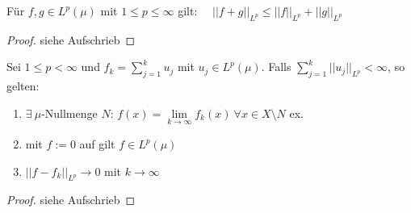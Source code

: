   \begin{theorem}
    Für $f,g \in L^p(\mu)$ mit $1 \leq p \leq \infty$ gilt: \ \ $|| f+g ||_{L^p} \leq ||f||_{L^p} + ||g||_{L^p}$
  \end{theorem}

  \begin{proof}
    siehe Aufschrieb
  \end{proof}

  \begin{lemma}
    Sei $1 \leq p < \infty$ und $f_k = \sum\limits_{j=1}^k u_j$ mit $u_j \in L^p(\mu)$. Falls $\sum\limits_{j=1}^k ||u_j||_{L^p} < \infty$, so gelten:
    \begin{enumerate}[label=\roman*)]
      \item $\exists \ \mu$-Nullmenge $N$: $f(x) = \lim\limits_{k \to \infty} f_k(x) \ \forall x \in X \setminus N$ ex.
      \item mit $f := 0$ auf gilt $f \in L^p(\mu)$
      \item $||f - f_k||_{L^p} \to 0$ mit $k \to \infty$
    \end{enumerate}
  \end{lemma}

  \begin{proof}
    siehe Aufschrieb
  \end{proof}